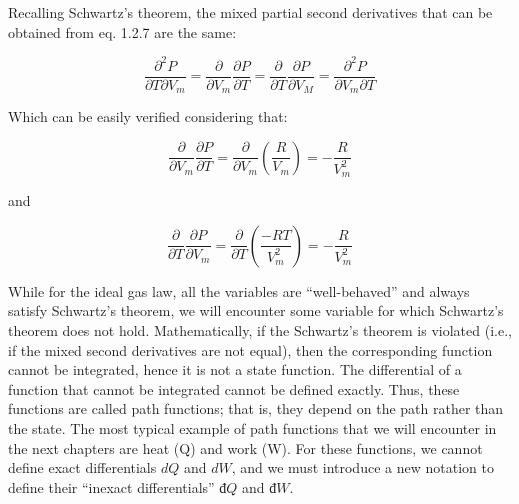 \documentclass[
]{book}
\theoremstyle{definition}
\theoremstyle{definition}
\theoremstyle{definition}
\theoremstyle{remark}
\begin{document}
Recalling Schwartz's theorem, the mixed partial second derivatives that can be obtained from eq. 1.2.7 are the same:

\begin{equation}
  \frac{\partial^2 P}{\partial T \partial V_m}=\frac{\partial}{\partial V_m}\frac{\partial P}{\partial T}=\frac{\partial}{\partial T}\frac{\partial P}{\partial V_M}=\frac{\partial^2 P}{\partial V_m \partial T}
  \label{eq:schwartzP}
\end{equation}

Which can be easily verified considering that:

\begin{equation}
  \frac{\partial}{\partial V_m} \frac{\partial P}{\partial T}  = \frac{\partial}{\partial V_m} \left(\frac{R}{V_m}\right) = -\frac{R}{V_m^2} 
  \label{eq:secondderPA}
\end{equation}

and

\begin{equation}
  \frac{\partial}{\partial T} \frac{\partial P}{\partial V_m}  = \frac{\partial}{\partial T} \left(\frac{-RT}{V_m^2}\right) = -\frac{R}{V_m^2} 
  \label{eq:secondderPB}
\end{equation}

While for the ideal gas law, all the variables are ``well-behaved'' and always satisfy Schwartz's theorem, we will encounter some variable for which Schwartz's theorem does not hold. Mathematically, if the Schwartz's theorem is violated (i.e., if the mixed second derivatives are not equal), then the corresponding function cannot be integrated, hence it is not a state function. The differential of a function that cannot be integrated cannot be defined exactly. Thus, these functions are called path functions; that is, they depend on the path rather than the state. The most typical example of path functions that we will encounter in the next chapters are heat (Q) and work (W). For these functions, we cannot define exact differentials \(dQ\) and \(dW\), and we must introduce a new notation to define their ``inexact differentials'' \(đ Q\) and \(đ W\).
\end{document}
